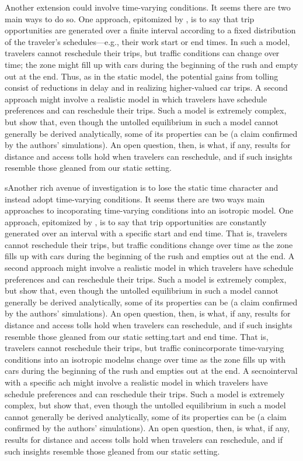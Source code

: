 \documentclass[preprint,authoryear]{elsarticle}
\begin{document}
Another extension could involve time-varying conditions. It seems there are two main ways to do so. One approach, epitomized by \citet{Gonzales2015}, is to say that trip opportunities are generated over a finite interval according to a fixed distribution of the traveler's schedules---e.g., their work start or end times. In such a model, travelers cannot reschedule their trips, but traffic conditions can change over time; the zone might fill up with cars during the beginning of the rush and empty out at the end. Thus, as in the static model, the potential gains from tolling consist of reductions in delay and in realizing higher-valued car trips. A second approach might involve a realistic model in which travelers have schedule preferences and can reschedule their trips. Such a model is extremely complex, but \citet{Lamotte2017} show that, even though the untolled equilibrium in such a model cannot generally be derived analytically, some of its properties can be (a claim confirmed by the authors' simulations). An open question, then, is what, if any, results for distance and access tolls hold when travelers can reschedule, and if such insights resemble those gleaned from our static setting.

 sAnother rich avenue of investigation is to lose the static time character and instead adopt time-varying conditions. It seems there are two ways main approaches to incoporating time-varying conditions into an isotropic model. One approach, epitomized by \citet{Gonzales2015}, is to say that trip opportunities are constantly generated over an interval with a specific start and end time. That is, travelers cannot reschedule their trips, but traffic conditions change over time as the zone fills up with cars during the beginning of the rush and empties out at the end. A second approach might involve a realistic model in which travelers have schedule preferences and can reschedule their trips. Such a model is extremely complex, but \citet{Lamotte2017} show that, even though the untolled equilibrium in such a model cannot generally be derived analytically, some of its properties can be (a claim confirmed by the authors' simulations). An open question, then, is what, if any, results for distance and access tolls hold when travelers can reschedule, and if such insights resemble those gleaned from our static setting.tart and end time. That is, travelers cannot reschedule their trips, but traffic conincorporate time-varying conditions into an isotropic modelns change over time as the zone fills up with cars during the beginning of the rush and empties out at the end. A secnointerval with a specific ach might involve a realistic model in which travelers have schedule preferences and can reschedule their trips. Such a model is extremely complex, but \citet{Lamotte2017} show that, even though the untolled equilibrium in such a model cannot generally be derived analytically, some of its properties can be (a claim confirmed by the authors' simulations). An open question, then, is what, if any, results for distance and access tolls hold when travelers can reschedule, and if such insights resemble those gleaned from our static setting.
\end{document}
